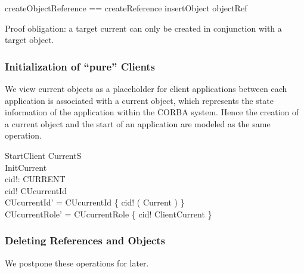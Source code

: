 \begin{zed}
  createObjectReference == createReference \land insertObject \land objectRef \\
\end{zed}
Proof obligation: a target current can only be created in conjunction with a
target object.


\subsubsection{Initialization of ``pure'' Clients}
We view current objects as a placeholder for client applications between each
application is associated with a current object, which represents the state
information of the application within the CORBA system.  Hence the creation of a 
current object and the start of an application are modeled as the same operation.
\begin{schema}{StartClient}
  \Delta CurrentS \\
  InitCurrent \\
  cid!: CURRENT \\
  \where
  cid! \notin \dom CUcurrentId \\
  CUcurrentId' = CUcurrentId \cup \{ cid! \mapsto ( \theta Current ) \} \\
  CUcurrentRole' = CUcurrentRole \cup \{ cid! \mapsto ClientCurrent \} \\
\end{schema}


\subsubsection{Deleting References and Objects}

We postpone these operations for later.

  

  



